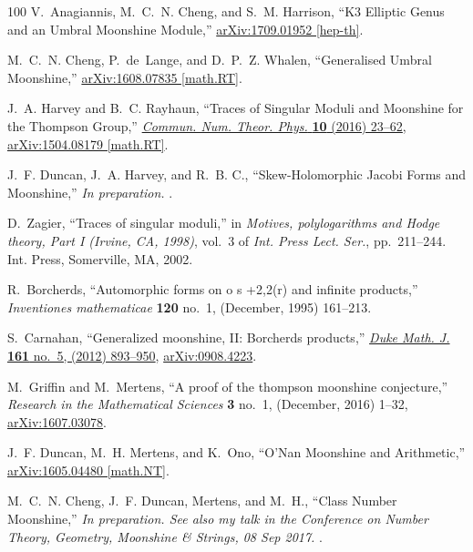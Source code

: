 \begin{thebibliography}{100}
V.~Anagiannis, M.~C.~N. Cheng, and S.~M. Harrison, ``{K3 Elliptic Genus and an
  Umbral Moonshine Module},''
\href{http://arxiv.org/abs/1709.01952}{{\ttfamily arXiv:1709.01952 [hep-th]}}.

M.~C.~N. Cheng, P.~de~Lange, and D.~P.~Z. Whalen, ``{Generalised Umbral
  Moonshine},''
\href{http://arxiv.org/abs/1608.07835}{{\ttfamily arXiv:1608.07835 [math.RT]}}.

J.~A. Harvey and B.~C. Rayhaun, ``{Traces of Singular Moduli and Moonshine for
  the Thompson Group},''
  \href{http://dx.doi.org/10.4310/CNTP.2016.v10.n1.a2}{{\em Commun. Num. Theor.
  Phys.} {\bfseries 10} (2016) 23--62},
\href{http://arxiv.org/abs/1504.08179}{{\ttfamily arXiv:1504.08179 [math.RT]}}.

J.~F. Duncan, J.~A. Harvey, and R.~B. C., ``{Skew-Holomorphic Jacobi Forms and
  Moonshine},'' {\em In preparation.} .

D.~Zagier, ``Traces of singular moduli,'' in {\em Motives, polylogarithms and
  {H}odge theory, {P}art {I} ({I}rvine, {CA}, 1998)}, vol.~3 of {\em Int. Press
  Lect. Ser.}, pp.~211--244.
\newblock Int. Press, Somerville, MA, 2002.

R.~Borcherds, ``Automorphic forms on o s +2,2(r) and infinite products,'' {\em
  Inventiones mathematicae} {\bfseries 120} no.~1, (December, 1995) 161--213.

S.~Carnahan, ``Generalized moonshine, {II}: {B}orcherds products,''
  \href{http://dx.doi.org/10.1215/00127094-1548416}{{\em Duke Math. J.}
  {\bfseries 161} no.~5, (2012) 893--950},
  \href{http://arxiv.org/abs/arXiv:0908.4223}{{\ttfamily arXiv:0908.4223}}.

M.~Griffin and M.~Mertens, ``A proof of the thompson moonshine conjecture,''
  {\em Research in the Mathematical Sciences} {\bfseries 3} no.~1, (December,
  2016) 1--32, \href{http://arxiv.org/abs/arXiv:1607.03078}{{\ttfamily
  arXiv:1607.03078}}.

J.~F. Duncan, M.~H. Mertens, and K.~Ono, ``{O'Nan Moonshine and Arithmetic},''
  \href{http://arxiv.org/abs/1605.04480}{{\ttfamily arXiv:1605.04480
  [math.NT]}}.

M.~C.~N. Cheng, J.~F. Duncan, Mertens, and M.~H., ``{Class Number Moonshine},''
  {\em In preparation. See also my talk in the Conference on Number Theory,
  Geometry, Moonshine \& Strings, 08 Sep 2017.} .


\end{thebibliography}
